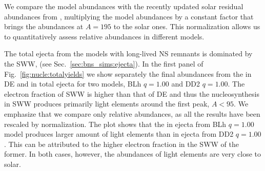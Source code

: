 We compare the model abundances with the recently updated solar residual 
\rproc{} abundances from \citet{Prantzos2020},
%
multiplying the model abundances by a constant factor that brings the abundances 
at $A=195$ to the solar ones. This normalization allows us to quantitatively 
assess relative abundances in different models.

The total ejecta from the models with long-lived \ac{NS} remnants is dominated by
the \ac{SWW}, %
(see Sec.~\ref{sec:bns_sims:ejecta}). 
%
In the first panel of Fig.~\ref{fig:nucle:totalyields} we show separately the 
final abundances from the \rproc{} in \ac{DE} and in total ejecta  
for two models, BLh $q=1.00$ and DD2 $q=1.00$. 
%
The electron fraction of \ac{SWW} is higher than that of \ac{DE} 
and thus the \rproc{} nucleosynthesis in 
\ac{SWW} produces primarily light elements around the first \rproc{} peak, $A<95$.
We emphasize that we compare only relative abundances, as all the results have 
been rescaled by normalization. 
%
The plot shows that the \rproc{} in ejecta from BLh $q=1.00$ model produces 
larger amount of light elements than in ejecta from DD2 $q=1.00$.
%
This can be attributed to the higher electron fraction in the \ac{SWW} 
of the former. In both cases, however, the abundances of light elements 
are very close to solar. 


